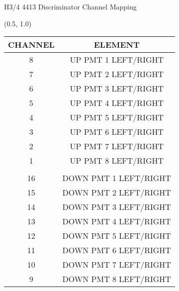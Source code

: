 \documentclass[10pt, xcolor={dvipsnames}, aspectratio = 169, sans,mathserif]{beamer}
\begin{document}
\begin{frame}{H3/4 4413 Discriminator Channel Mapping}

\begin{textblock}{7.0}(0.5, 1.0)
\begin{table}
\begin{center}
\begin{tabular}{
    |>{\columncolor{lime!20}}c
    |>{\columncolor{blue!20}}c|
}
\hline
CHANNEL & ELEMENT \\
\hline
8 & UP PMT 1 LEFT/RIGHT \\
7 & UP PMT 2 LEFT/RIGHT \\
6 & UP PMT 3 LEFT/RIGHT \\
5 & UP PMT 4 LEFT/RIGHT \\
4 & UP PMT 5 LEFT/RIGHT \\
3 & UP PMT 6 LEFT/RIGHT \\
2 & UP PMT 7 LEFT/RIGHT \\
1 & UP PMT 8 LEFT/RIGHT \\
  &                     \\
16 & DOWN PMT 1 LEFT/RIGHT \\
15 & DOWN PMT 2 LEFT/RIGHT \\
14 & DOWN PMT 3 LEFT/RIGHT \\
13 & DOWN PMT 4 LEFT/RIGHT \\
12 & DOWN PMT 5 LEFT/RIGHT \\
11 & DOWN PMT 6 LEFT/RIGHT \\
10 & DOWN PMT 7 LEFT/RIGHT \\
9  & DOWN PMT 8 LEFT/RIGHT \\
\hline
\end{tabular}
\end{center}
\end{table}
\end{textblock}


\end{frame}
\end{document}
